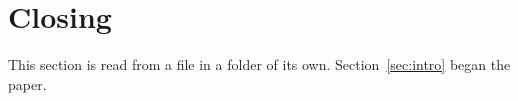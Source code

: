 \section{Closing}\label{sec:closing}

This section is read from a file in a folder of its own. Section~\ref{sec:intro} began the paper.
